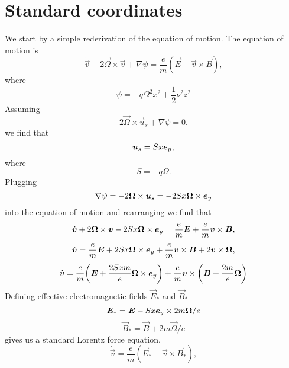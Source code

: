 \documentclass[aps,pre,notitlepage,amsmath,amssymb,amsfonts,nobibnotes,nofootinbib,superscriptaddress,onecolumn,a4paper,10pt]{revtex4-1}
\begin{document}
\section{Standard coordinates}
We start by a simple rederivation of the equation of motion.
The equation of motion is
\begin{equation}
  \dot{\vec{v}} + 2\vec{\Omega}\times\vec{v} + \nabla\psi =
  \frac{e}{m}(\vec{E} + \vec{v}\times\vec{B}),
\end{equation}
where
\begin{equation}
  \label{eq:tidal-potential}
  \psi = -q\Omega^2 x^2 + \frac{1}{2}\nu^2 z^2
\end{equation}
Assuming
\begin{equation}
  2\vec{\Omega}\times\vec{u}_s + \nabla\psi = 0.
\end{equation}
we find that
\begin{equation}
  \label{eq:common-shear-flow}
  \bm{u}_s = Sx\bm{e}_y,
\end{equation}
where
\begin{equation}
  S = -q\Omega.
\end{equation}
Plugging
\begin{equation}
   \nabla\psi = -2\bm{\Omega}\times\bm{u}_s =
   -2Sx\bm{\Omega}\times \bm{e}_y
\end{equation}
into the equation of motion and rearranging we find that
\begin{equation}
  \dot{\bm{v}} + 2\bm{\Omega}\times\bm{v} -2Sx\bm{\Omega}\times \bm{e}_y =
  \frac{e}{m}\bm{E} + \frac{e}{m}\bm{v}\times\bm{B},
\end{equation}
\begin{equation}
  \dot{\bm{v}} =
  \frac{e}{m}\bm{E} + 2Sx\bm{\Omega}\times \bm{e}_y
+ \frac{e}{m}\bm{v}\times\bm{B} + 2\bm{v}\times\bm{\Omega} ,
\end{equation}
\begin{equation}
  \dot{\vec{v}} =
  \frac{e}{m}\left(\vec{E} + \frac{2Sxm}{e}\vec{\Omega}\times \ey\right)
+ \frac{e}{m}\vec{v}\times \left( \vec{B} + \frac{2m}{e}\vec{\Omega} \right)
\end{equation}
Defining effective electromagnetic fields $\vec{E}_\ast$ and $\vec{B}_\ast$
\begin{equation}
  \bm{E}_\ast = \bm{E} - Sx \bm{e}_y\times2m\bm{\Omega}/e
\end{equation}
\begin{equation}
  \vec{B}_\ast =  \vec{B} + 2m\vec{\Omega}/e
\end{equation}
gives us a standard Lorentz force equation.
\begin{equation}
  \dot{\vec{v}} =
  \frac{e}{m}(\vec{E}_\ast + \vec{v}\times\vec{B}_\ast),
\end{equation}
\end{document}
